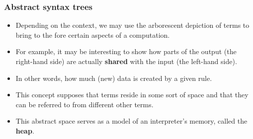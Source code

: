 \documentclass[compress,dvips,xcolor={dvipsnames},t]{beamer}
\begin{document}
\begin{frame}
  \frametitle{Abstract syntax trees}

  \begin{itemize}

    \item Depending on the context, we may use the arborescent
      depiction of terms to bring to the fore certain aspects of a
      computation.

    \item For example, it may be interesting to show how parts of the
      output (the right\hyp{}hand side) are actually \textbf{shared}
      with the input (the left\hyp{}hand side).

    \item In other words, how much (new) data is created by a given
      rule.

    \item This concept supposes that terms reside in some sort of
      space and that they can be referred to from different other
      terms.

    \item This abstract space serves as a model of an interpreter's
      memory, called the \textbf{heap}.

  \end{itemize}

\end{frame}
\end{document}
